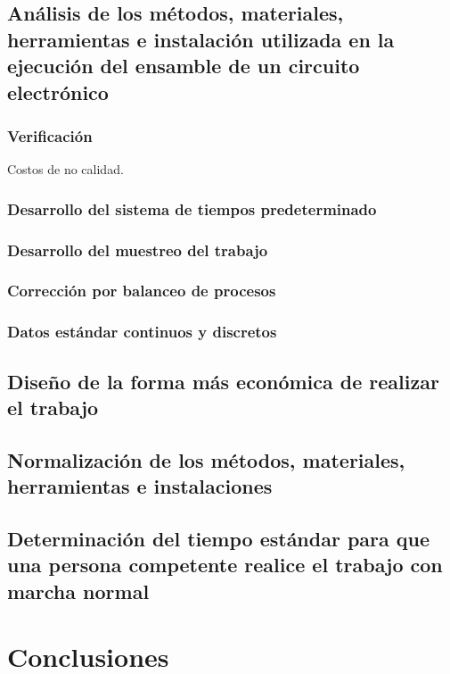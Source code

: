     
    \subsection{Análisis de los métodos, materiales, herramientas e instalación utilizada en la ejecución del ensamble de un circuito electrónico}
    
    \subsubsection{Verificación}
    
    Costos de no calidad.
    \subsubsection{Desarrollo del sistema de tiempos predeterminado}
    \subsubsection{Desarrollo del muestreo del trabajo}
    \subsubsection{Corrección por balanceo de procesos}
    \subsubsection{Datos estándar continuos y discretos}
    \subsection{Diseño de la forma más económica de realizar el trabajo}
    
    \subsection{Normalización de los métodos, materiales, herramientas e instalaciones}
    
    \subsection{Determinación del tiempo estándar para que una persona competente realice el trabajo con marcha normal}
    
    
    \section{Conclusiones}
    
